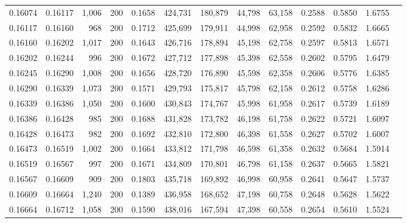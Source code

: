 \begin{tabular}{rrrrrrrrrrrrr}
0.16074 & 0.16117 & 1,006 & 200 &                                     0.1658 & 424,731 & 180,879 &  44,798 &  63,158 & 0.2588 & 0.5850 & 1.6755 \\
0.16117 & 0.16160 &   968 & 200 &                                     0.1712 & 425,699 & 179,911 &  44,998 &  62,958 & 0.2592 & 0.5832 & 1.6665 \\
0.16160 & 0.16202 & 1,017 & 200 &                                     0.1643 & 426,716 & 178,894 &  45,198 &  62,758 & 0.2597 & 0.5813 & 1.6571 \\
0.16202 & 0.16244 &   996 & 200 &                                     0.1672 & 427,712 & 177,898 &  45,398 &  62,558 & 0.2602 & 0.5795 & 1.6479 \\
0.16245 & 0.16290 & 1,008 & 200 &                                     0.1656 & 428,720 & 176,890 &  45,598 &  62,358 & 0.2606 & 0.5776 & 1.6385 \\
0.16290 & 0.16339 & 1,073 & 200 &                                     0.1571 & 429,793 & 175,817 &  45,798 &  62,158 & 0.2612 & 0.5758 & 1.6286 \\
0.16339 & 0.16386 & 1,050 & 200 &                                     0.1600 & 430,843 & 174,767 &  45,998 &  61,958 & 0.2617 & 0.5739 & 1.6189 \\
0.16386 & 0.16428 &   985 & 200 &                                     0.1688 & 431,828 & 173,782 &  46,198 &  61,758 & 0.2622 & 0.5721 & 1.6097 \\
0.16428 & 0.16473 &   982 & 200 &                                     0.1692 & 432,810 & 172,800 &  46,398 &  61,558 & 0.2627 & 0.5702 & 1.6007 \\
0.16473 & 0.16519 & 1,002 & 200 &                                     0.1664 & 433,812 & 171,798 &  46,598 &  61,358 & 0.2632 & 0.5684 & 1.5914 \\
0.16519 & 0.16567 &   997 & 200 &                                     0.1671 & 434,809 & 170,801 &  46,798 &  61,158 & 0.2637 & 0.5665 & 1.5821 \\
0.16567 & 0.16609 &   909 & 200 &                                     0.1803 & 435,718 & 169,892 &  46,998 &  60,958 & 0.2641 & 0.5647 & 1.5737 \\
0.16609 & 0.16664 & 1,240 & 200 &                                     0.1389 & 436,958 & 168,652 &  47,198 &  60,758 & 0.2648 & 0.5628 & 1.5622 \\
0.16664 & 0.16712 & 1,058 & 200 &                                     0.1590 & 438,016 & 167,594 &  47,398 &  60,558 & 0.2654 & 0.5610 & 1.5524 \\

\end{tabular}
